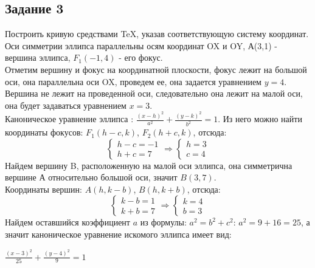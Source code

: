 \documentclass[12pt, a4paper]{article}
\begin{document}
\newpage
\begin{center}
    \section*{Задание 3}
\end{center}
\justifying
Построить кривую средствами \TeX, указав соответствующую систему координат.\\
Оси симметрии эллипса параллельны осям координат OX
и OY, А(3,1) - вершина эллипса, $F_1(-1,4)$ - его 
фокус.\\
Отметим вершину и фокус на координатной плоскости, 
фокус лежит на большой оси, она параллельна оси OX, 
проведем ее, она задается уравнением $y=4$. Вершина 
не лежит на проведенной оси, следовательно она лежит 
на малой оси, она будет задаваться уравнением $x=3$.
\\
Каноническое уравнение эллипса : $\frac{(x-h)^2}
{a^2}+\frac{(y-k)^2}{b^2}=1$. Из него можно найти 
координаты фокусов: $F_1(h-c, k)$, $F_2(h+c, k)$,
отсюда:\\
\begin{equation*}
 \begin{cases}
   h - c = -1\\
   h+c=7
 \end{cases}
 \Rightarrow
  \begin{cases}
   h=3\\
   c=4
 \end{cases}
\end{equation*}
Найдем вершину B, расположенную на малой оси 
эллипса, она симметрична вершине А относительно
большой оси, значит $B(3,7)$.\\
Координаты вершин: $A(h, k-b)$, $B(h, k+b)$,
отсюда:\\
\begin{equation*}
 \begin{cases}
   k-b=1\\
   k+b=7
 \end{cases}
 \Rightarrow
  \begin{cases}
   k=4\\
   b=3
 \end{cases}
\end{equation*}
Найдем оставшийся коэффициент $a$ из формулы: $a^2=
b^2+c^2$: $a^2=9+16=25$, а значит каноническое 
уравнение искомого эллипса имеет вид:\\
\begin{center}
	$\frac{(x-3)^2}
{25}+\frac{(y-4)^2}{9}=1$
\end{center}
\end{document}
